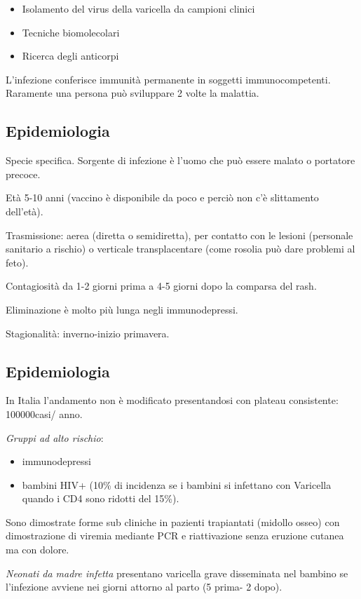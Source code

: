 \begin{itemize}
\item
  Isolamento del virus della varicella da campioni clinici
\item
  Tecniche biomolecolari
\item
  Ricerca degli anticorpi
\end{itemize}

L'infezione conferisce immunità permanente in soggetti immunocompetenti.
Raramente una persona può sviluppare 2 volte la malattia.

\subsection{Epidemiologia}

Specie specifica. Sorgente di infezione è l'uomo che può essere malato o
portatore precoce.

Età 5-10 anni (vaccino è disponibile da poco e perciò non c'è
slittamento dell'età).

Trasmissione: aerea (diretta o semidiretta), per contatto con le lesioni
(personale sanitario a rischio) o verticale transplacentare (come
rosolia può dare problemi al feto).

Contagiosità da 1-2 giorni prima a 4-5 giorni dopo la comparsa del rash.

Eliminazione è molto più lunga negli immunodepressi.

Stagionalità: inverno-inizio primavera.

\subsection{Epidemiologia}

In Italia l'andamento non è modificato presentandosi con plateau
consistente: 100000casi/ anno.

\emph{Gruppi ad alto rischio}:

\begin{itemize}
\item
  immunodepressi
\item
  bambini HIV+ (10\% di incidenza se i bambini si infettano con
  Varicella quando i CD4 sono ridotti del 15\%).
\end{itemize}

Sono dimostrate forme sub cliniche in pazienti trapiantati (midollo
osseo) con dimostrazione di viremia mediante PCR e riattivazione senza
eruzione cutanea ma con dolore.

\emph{Neonati da madre infetta} presentano varicella grave disseminata
nel bambino se l'infezione avviene nei giorni attorno al parto (5 prima-
2 dopo).

